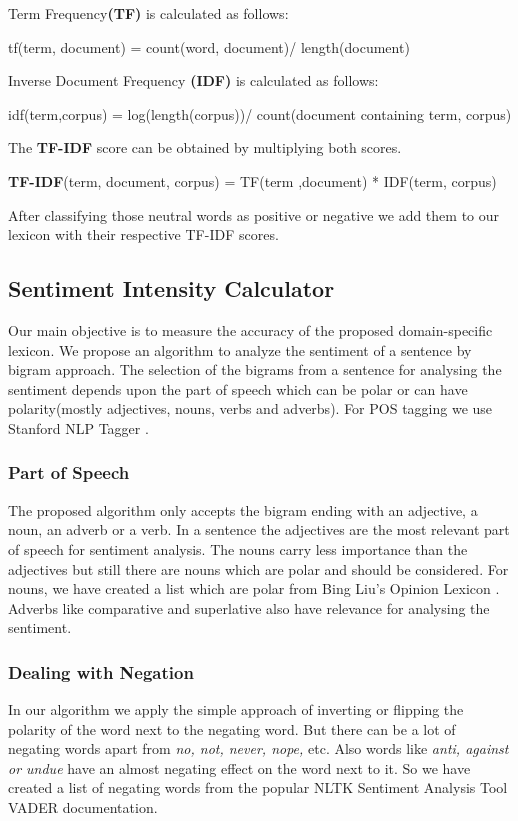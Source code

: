 \documentclass[a4paper, 10pt, conference]{ieeeconf}
\begin{document}
	Term Frequency\textbf{(TF)} is calculated as follows:
	
	tf(term, document) = count(word, document)/ length(document)
	
	
	Inverse Document Frequency \textbf{(IDF)} is calculated as follows:
	
	idf(term,corpus) = log(length(corpus))/ 	count(document containing term, corpus)
	
	
	The \textbf{TF-IDF} score can be obtained by multiplying both scores. 
	
	\textbf{TF-IDF}(term, document, corpus) = TF(term ,document)
	* IDF(term, corpus)
	
	After classifying those neutral words as positive or negative we add them to our lexicon with their respective TF-IDF scores.
	
	\subsection{Sentiment Intensity Calculator}
	Our main objective is to measure the accuracy of the proposed domain-specific lexicon. We propose an algorithm to analyze the sentiment of a sentence by bigram approach. The selection of the bigrams from a sentence for analysing the sentiment depends upon the part of speech which can be polar or can have polarity(mostly adjectives, nouns, verbs and adverbs). For POS tagging we use Stanford NLP Tagger \cite{c13}.
	\subsubsection{Part of Speech}
	The proposed algorithm only accepts the bigram ending with an adjective, a noun, an adverb or a verb.
	In a sentence the adjectives are the most relevant part of speech for sentiment analysis. The nouns carry less importance than the adjectives but still there are nouns which are polar and should be considered. For nouns, we have created a list which are polar from Bing Liu's Opinion Lexicon \cite{c14,c15}. Adverbs like comparative and superlative also have relevance for analysing the sentiment. 
	\subsubsection{Dealing with Negation}In our algorithm we apply the simple approach of inverting or flipping the polarity of the word next to the negating word. But there can be a lot of negating words apart from \textit{no, not, never, nope, }etc. Also words like \textit{anti, against or undue} have an almost negating effect on the word next to it. So we have created a list of negating words from the popular NLTK Sentiment Analysis Tool VADER \cite{c16} documentation.
\end{document}
